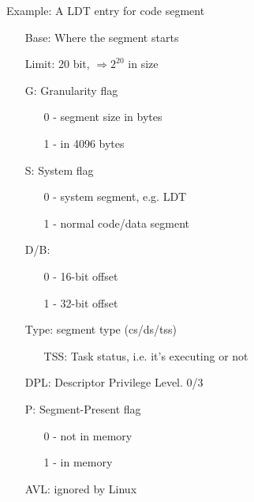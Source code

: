 \begin{frame}[plain]%
  \begin{block}{Example: A LDT entry for code segment}
    \begin{center}
    \end{center}
  \end{block}
  {\small
    \begin{multicols}{2}
      \begin{itemize}
      \item[Base:] Where the segment starts
      \item[Limit:] 20 bit, $\Rightarrow{}2^{20}$ in size
      \item[G:] Granularity flag
        \begin{itemize}
        \item[0] - segment size in bytes
        \item[1] - in 4096 bytes
        \end{itemize}
      \item[S:] System flag
        \begin{itemize}
        \item[0] - system segment, e.g. LDT
        \item[1] - normal code/data segment
        \end{itemize}\columnbreak
      \item[D/B:]
        \begin{itemize}
        \item[0] - 16-bit offset
        \item[1] - 32-bit offset
        \end{itemize}
      \item[Type:] segment type (cs/ds/tss)
        \begin{itemize}
        \item[TSS:] Task status, i.e. it's executing or not
        \end{itemize}
      \item[DPL:] Descriptor Privilege Level. 0/3
      \item[P:] Segment-Present flag
        \begin{itemize}
        \item[0] - not in memory
        \item[1] - in memory
        \end{itemize}
      \item[AVL:] ignored by Linux
      \end{itemize}
    \end{multicols}}
\end{frame}

